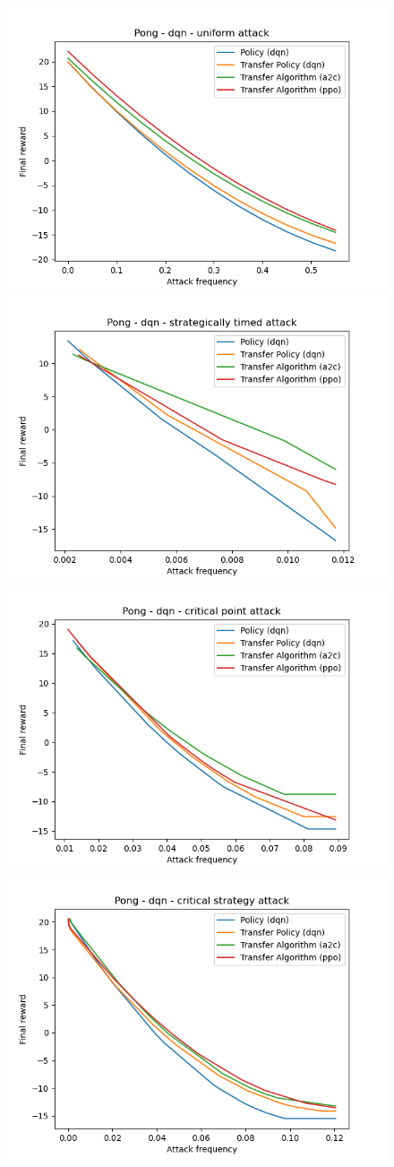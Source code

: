 \begin{figure}
  \centering
    {\includegraphics[width=0.49\linewidth]{images/exp1/dqn-pong-uniform.png}}
    {\includegraphics[width=0.49\linewidth]{images/exp1/dqn-pong-strategically_timed.png}}
    {\includegraphics[width=0.49\linewidth]{images/exp1/dqn-pong-critical_point.png}}
    {\includegraphics[width=0.49\linewidth]{images/exp1/dqn-pong-critical_strategy.png}}

\end{figure}
